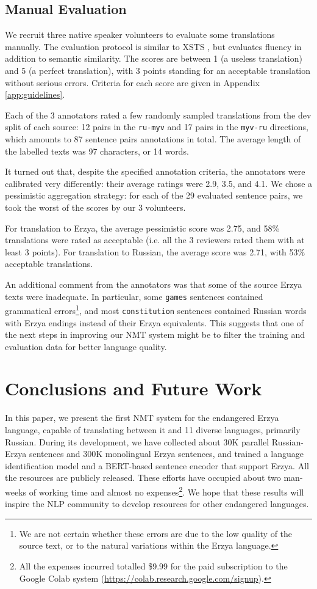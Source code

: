 \documentclass[11pt]{article}
\begin{document}
\subsection{Manual Evaluation}
\label{sec:manual}
We recruit three native speaker volunteers to evaluate some translations manually. The evaluation protocol is similar to XSTS \cite{nllb2022}, but evaluates fluency in addition to semantic similarity. The scores are between 1 (a useless translation) and 5 (a perfect translation), with 3 points standing for an acceptable translation without serious errors. Criteria for each score are given in Appendix \ref{app:guidelines}.

Each of the 3 annotators rated a few randomly sampled translations from the dev split of each source: 12 pairs in the \texttt{ru-myv} and 17 pairs in the \texttt{myv-ru} directions, which amounts to 87 sentence pairs annotations in total. The average length of the labelled texts was 97 characters, or 14 words.

It turned out that, despite the specified annotation criteria, the annotators were calibrated very differently: their average ratings were 2.9, 3.5, and 4.1. We chose a pessimistic aggregation strategy: for each of the 29 evaluated sentence pairs, we took the worst of the scores by our 3 volunteers.

For translation to Erzya, the average pessimistic score was 2.75, and 58\% translations were rated as acceptable (i.e. all the 3 reviewers rated them with at least 3 points). For translation to Russian, the average score was 2.71, with 53\% acceptable translations.

An additional comment from the annotators was that some of the source Erzya texts were inadequate. In particular, some \texttt{games} sentences contained grammatical errors\footnote{We are not certain whether these errors are due to the low quality of the source text, or to the natural variations within the Erzya language.}, and most \texttt{constitution} sentences contained Russian words with Erzya endings instead of their Erzya equivalents. This suggests that one of the next steps in improving our NMT system might be to filter the training and evaluation data for better language quality.

\section{Conclusions and Future Work}
In this paper, we present the first NMT system for the endangered Erzya language, capable of translating between it and 11 diverse languages, primarily Russian. During its development, we have collected about 30K parallel Russian-Erzya sentences and 300K monolingual Erzya sentences, and trained a language identification model and a BERT-based sentence encoder that support Erzya. All the resources are publicly released. These efforts have occupied about two man-weeks of working time and almost no expenses\footnote{All the expenses incurred totalled \$9.99 for the paid subscription to the Google Colab system (\url{https://colab.research.google.com/signup}).}. We hope that these results will inspire the NLP community to develop resources for other endangered languages.
\end{document}
